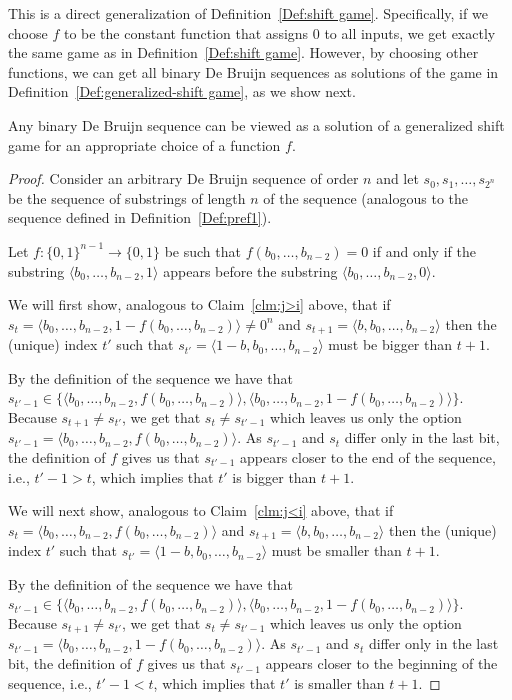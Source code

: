 \documentclass[final,12pt]{elsarticle}
\theoremstyle{definition} \newtheorem{definition}[theorem]{Definition} \newtheorem{observation}[theorem]{Observation} \newtheorem{example}[theorem]{Example} \newtheorem{remark}[theorem]{Remark} \newtheorem{corrolary}[theorem]{Corrolary}
\newcommand{\REF}[2]{#1~\ref{#2}}
\newcommand{\T}[1]{\langle{#1}\rangle} \DeclareMathOperator{\drop}{drop} \DeclareMathOperator{\dropbits}{drop\_bits} \DeclareMathOperator{\dropstates}{drop\_states} \DeclareMathOperator{\leadingForm}{LeadingForm} \DeclareMathOperator{\dv}{div} %
\begin{document}
This is a direct generalization of \REF{Definition}{Def:shift game}. Specifically, if we choose $f$ to be the constant function that assigns 0 to all inputs, we get exactly the same game as in \REF{Definition}{Def:shift game}. However, by choosing other functions, we can get all binary De Bruijn sequences as solutions of the game in \REF{Definition}{Def:generalized-shift game}, as we show next.

\begin{proposition}
	Any binary De Bruijn sequence can be viewed as a solution of a generalized shift game for an appropriate choice of a function $f$.
\end{proposition}
\begin{proof}
	Consider an arbitrary De Bruijn sequence of order $n$ and let $s_0, s_1, \dots, s_{2^n}$ be the sequence of substrings of length $n$ of the sequence (analogous to the sequence defined in Definition~\ref{Def:pref1}). 
	
	Let $f\colon \{0,1\}^{n-1} \to \{0,1\}$ be such that $f(b_0,\dots,b_{n-2})=0$ if and only if the substring $\T{b_0,\dots,b_{n-2},1}$ appears before the substring $\T{b_0,\dots,b_{n-2},0}$. 
	
	We will first show, analogous to  Claim~\ref{clm:j>i} above, that if $s_t=\T{b_0,\dots,b_{n-2},1-f(b_0,\dots,b_{n-2})} \neq 0^n$ and $s_{t+1}=\T{b,b_0,\dots,b_{n-2}}$ then the (unique) index $t'$ such that $s_{t'}=\T{1-b,b_0,\dots,b_{n-2}}$ must be bigger than $t+1$. 
	
	By the definition of the sequence we have that $s_{t'-1} \in \{ \langle b_0,\dots,b_{n-2},f(b_0,\dots,b_{n-2})\rangle, \langle b_0,\dots,b_{n-2},1-f(b_0,\dots,b_{n-2}) \rangle \}$. Because $s_{t+1} \neq s_{t'}$, we get that $s_{t} \neq s_{t'-1}$ which leaves us only the option $s_{t'-1}=\T{b_0,\dots,b_{n-2},f(b_0,\dots,b_{n-2})}$. As $s_{t'-1}$ and $s_{t}$ differ only in the last bit, the definition of $f$ gives us that $s_{t'-1}$ appears closer to the end of the sequence, i.e., $t'-1 > t$, which implies that $t'$ is bigger than $t+1$.

	We will next show, analogous to  Claim~\ref{clm:j<i} above, that if $s_t=\T{b_0,\dots,b_{n-2},f(b_0,\dots,b_{n-2})}$ and $s_{t+1}=\T{b,b_0,\dots,b_{n-2}}$ then the (unique) index $t'$ such that $s_{t'}=\T{1-b,b_0,\dots,b_{n-2}}$ must be smaller than $t+1$. 

	By the definition of the sequence we have that $s_{t'-1} \in \{ \langle b_0,\dots,b_{n-2},f(b_0,\dots,b_{n-2})\rangle, \langle b_0,\dots,b_{n-2},1-f(b_0,\dots,b_{n-2}) \rangle \}$. Because $s_{t+1} \neq s_{t'}$, we get that $s_{t} \neq s_{t'-1}$ which leaves us only the option $s_{t'-1}=\T{b_0,\dots,b_{n-2},1-f(b_0,\dots,b_{n-2})}$. As $s_{t'-1}$ and $s_{t}$ differ only in the last bit, the definition of $f$ gives us that $s_{t'-1}$ appears closer to the beginning of the sequence, i.e., $t'-1 < t$, which implies that $t'$ is smaller than $t+1$.


\end{proof}
\end{document}
